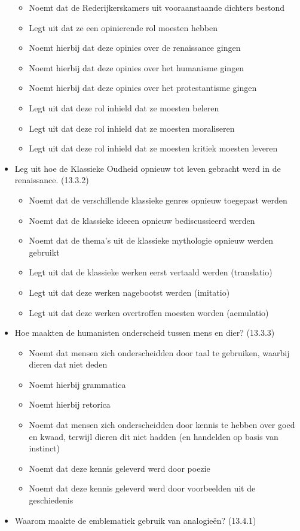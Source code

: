 \begin{itemize}
  \begin{itemize}
  \itemsep1pt\parskip0pt
  \item
    Noemt dat de Rederijkerskamers uit vooraanstaande dichters bestond
  \item
    Legt uit dat ze een opinierende rol moesten hebben
  \item
    Noemt hierbij dat deze opinies over de renaissance gingen
  \item
    Noemt hierbij dat deze opinies over het humanisme gingen
  \item
    Noemt hierbij dat deze opinies over het protestantisme gingen
  \item
    Legt uit dat deze rol inhield dat ze moesten beleren
  \item
    Legt uit dat deze rol inhield dat ze moesten moraliseren
  \item
    Legt uit dat deze rol inhield dat ze moesten kritiek moesten leveren
  \end{itemize}
\item
  Leg uit hoe de Klassieke Oudheid opnieuw tot leven gebracht werd in de
  renaissance. (13.3.2)

  \begin{itemize}
  \itemsep1pt\parskip0pt
  \item
    Noemt dat de verschillende klassieke genres opnieuw toegepast werden
  \item
    Noemt dat de klassieke ideeen opnieuw bediscussieerd werden
  \item
    Noemt dat de thema's uit de klassieke mythologie opnieuw werden
    gebruikt
  \item
    Legt uit dat de klassieke werken eerst vertaald werden (translatio)
  \item
    Legt uit dat deze werken nagebootst werden (imitatio)
  \item
    Legt uit dat deze werken overtroffen moesten worden (aemulatio)
  \end{itemize}
\item
  Hoe maakten de humanisten onderscheid tussen mens en dier? (13.3.3)

  \begin{itemize}
  \itemsep1pt\parskip0pt
  \item
    Noemt dat mensen zich onderscheidden door taal te gebruiken, waarbij
    dieren dat niet deden
  \item
    Noemt hierbij grammatica
  \item
    Noemt hierbij retorica
  \item
    Noemt dat mensen zich onderscheidden door kennis te hebben over goed
    en kwaad, terwijl dieren dit niet hadden (en handelden op basis van
    instinct)
  \item
    Noemt dat deze kennis geleverd werd door poezie
  \item
    Noemt dat deze kennis geleverd werd door voorbeelden uit de
    geschiedenis
  \end{itemize}
\item
  Waarom maakte de emblematiek gebruik van analogieën? (13.4.1)


\end{itemize}
